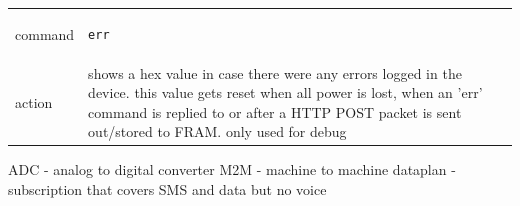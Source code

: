 \documentclass[a4paper,twoside]{refart}
\begin{document}
\begin{tabular}{ |l|p{8cm}| }
    \hline
        command & 
\begin{lstlisting}
err
\end{lstlisting} \\
        action & 
shows a hex value in case there were any errors logged in the device. this value gets reset when all power is lost, when an 'err' command is replied to or after a HTTP POST packet is sent out/stored to FRAM. only used for debug  \\ \hline
\end{tabular}




ADC - analog to digital converter
M2M - machine to machine dataplan - subscription that covers SMS and data but no voice
\end{document}
